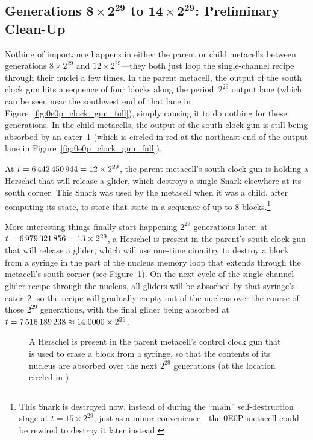 \subsection{Generations $\mathbf{8 \times 2^{29}}$ to $\mathbf{14 \times 2^{29}}$: Preliminary Clean-Up}\label{sec:0e0p_timeline_prelim_cleanup}

Nothing of importance happens in either the parent or child metacells between generations $8 \times 2^{29}$ and $12 \times 2^{29}$---they both just loop the single-channel recipe through their nuclei a few times. In the parent metacell, the output of the south clock gun hits a sequence of four blocks along the period~$2^{29}$ output lane (which can be seen near the southwest end of that lane in Figure~\ref{fig:0e0p_clock_gun_full}), simply causing it to do nothing for these generations. In the child metacells, the output of the south clock gun is still being absorbed by an eater~1 (which is circled in red at the northeast end of the output lane in Figure~\ref{fig:0e0p_clock_gun_full}).

At $t = 6{\,}442{\,}450{\,}944 = 12 \times 2^{29}$, the parent metacell's south clock gun is holding a Herschel that will release a glider, which destroys a single Snark elsewhere at its south corner. This Snark was used by the metacell when it was a child, after computing its state, to store that state in a sequence of up to 8 blocks.\footnote{This Snark is destroyed now, instead of during the ``main'' self-destruction stage at $t = 15 \times 2^{29}$, just as a minor convenience---the 0E0P metacell could be rewired to destroy it later instead.}

More interesting things finally start happening $2^{29}$ generations later: at $t = 6{\,}979{\,}321{\,}856 = 13 \times 2^{29}$, a Herschel is present in the parent's south clock gun that will release a glider, which will use one-time circuitry to destroy a block from a syringe in the part of the nucleus memory loop that extends through the metacell's south corner (see Figure~\ref{fig:0e0p_timeline_6979321856}). On the next cycle of the single-channel glider recipe through the nucleus, all gliders will be absorbed by that syringe's eater~2, so the recipe will gradually empty out of the nucleus over the course of those $2^{29}$ generations, with the final glider being absorbed at $t = 7{\,}516{\,}189{\,}238 \approx 14.0000 \times 2^{29}$.

\begin{figure}[!htb]
	\centering
	\caption{A Herschel is present in the parent metacell's control clock gun that is used to erase a block from a syringe, so that the contents of its nucleus are absorbed over the next $2^{29}$ generations (at the location circled in ).}
	\label{fig:0e0p_timeline_6979321856}
\end{figure}

